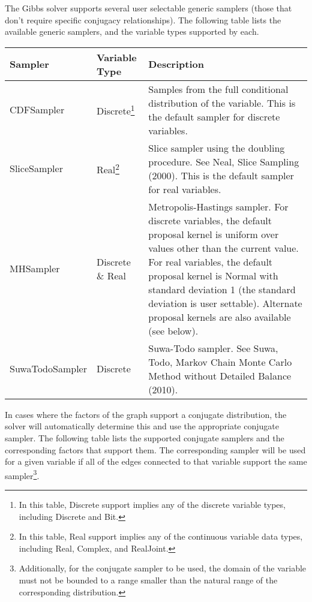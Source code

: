 The Gibbs solver supports several user selectable generic samplers (those that don't require specific conjugacy relationships).  The following table lists the available generic samplers, and the variable types supported by each.

\begin{longtable} {l l p{8.0cm}}
Sampler & Variable Type &  Description \\
\hline
\endhead
CDFSampler & Discrete\footnote{In this table, Discrete support implies any of the discrete variable types, including Discrete and Bit.} & Samples from the full conditional distribution of the variable.  This is the default sampler for discrete variables. \\
SliceSampler & Real\footnote{In this table, Real support implies any of the continuous variable data types, including Real, Complex, and RealJoint.} & Slice sampler using the doubling procedure.  See Neal, Slice Sampling (2000).  This is the default sampler for real variables. \\
MHSampler & Discrete \& Real & Metropolis-Hastings sampler.  For discrete variables, the default proposal kernel is uniform over values other than the current value.  For real variables, the default proposal kernel is Normal with standard deviation 1 (the standard deviation is user settable).  Alternate proposal kernels are also available (see below). \\
SuwaTodoSampler & Discrete & Suwa-Todo sampler.  See Suwa, Todo, Markov Chain Monte Carlo Method without Detailed Balance (2010). \\
\end{longtable}


In cases where the factors of the graph support a conjugate distribution, the solver will automatically determine this and use the appropriate conjugate sampler.  The following table lists the supported conjugate samplers and the corresponding factors that support them.  The corresponding sampler will be used for a given variable if all of the edges connected to that variable support the same sampler\footnote{Additionally, for the conjugate sampler to be used, the domain of the variable must not be bounded to a range smaller than the natural range of the corresponding distribution.}.

